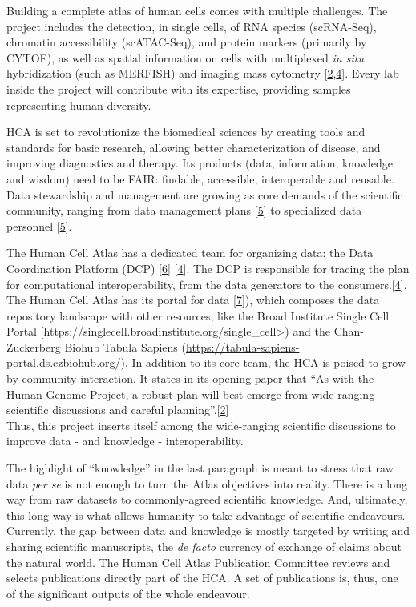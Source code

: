 Building a complete atlas of human cells comes with multiple challenges. The project includes the detection, in single cells, of RNA species (scRNA-Seq), chromatin accessibility (scATAC-Seq), and protein markers (primarily by CYTOF), as well as spatial information on cells with multiplexed \emph{in situ} hybridization (such as MERFISH) and imaging mass cytometry {[}\protect\hyperlink{ref-1GmbExweg}{2},\protect\hyperlink{ref-kkwRTArg}{4}{]}. Every lab inside the project will contribute with its expertise, providing samples representing human diversity.

HCA is set to revolutionize the biomedical sciences by creating tools and standards for basic research, allowing better characterization of disease, and improving diagnostics and therapy.
Its products (data, information, knowledge and wisdom) need to be FAIR: findable, accessible, interoperable and reusable.
Data stewardship and management are growing as core demands of the scientific community, ranging from data management plans {[}\protect\hyperlink{ref-1DSEIjFha}{5}{]} to specialized data personnel {[}\protect\hyperlink{ref-1DSEIjFha}{5}{]}.

The Human Cell Atlas has a dedicated team for organizing data: the Data Coordination Platform (DCP) {[}\protect\hyperlink{ref-zDRzmIGu}{6}{]} {[}\protect\hyperlink{ref-kkwRTArg}{4}{]}.
The DCP is responsible for tracing the plan for computational interoperability, from the data generators to the consumers.{[}\protect\hyperlink{ref-kkwRTArg}{4}{]}.
The Human Cell Atlas has its portal for data {[}\protect\hyperlink{ref-kX6KnbUo}{7}{]}), which composes the data repository landscape with other resources, like the Broad Institute Single Cell Portal {[}https://singlecell.broadinstitute.org/single\_cell\textgreater) and the Chan-Zuckerberg Biohub Tabula Sapiens (\url{https://tabula-sapiens-portal.ds.czbiohub.org/}).
In addition to its core team, the HCA is poised to grow by community interaction. It states in its opening paper that ``As with the Human Genome Project, a robust plan will best emerge from wide-ranging scientific discussions and careful planning''.{[}\protect\hyperlink{ref-1GmbExweg}{2}{]}\\
Thus, this project inserts itself among the wide-ranging scientific discussions to improve data - and knowledge - interoperability.

The highlight of ``knowledge'' in the last paragraph is meant to stress that raw data \emph{per se} is not enough to turn the Atlas objectives into reality.
There is a long way from raw datasets to commonly-agreed scientific knowledge.
And, ultimately, this long way is what allows humanity to take advantage of scientific endeavours.
Currently, the gap between data and knowledge is mostly targeted by writing and sharing scientific manuscripts, the \emph{de facto} currency of exchange of claims about the natural world.
The Human Cell Atlas Publication Committee reviews and selects publications directly part of the HCA.
A set of publications is, thus, one of the significant outputs of the whole endeavour.

